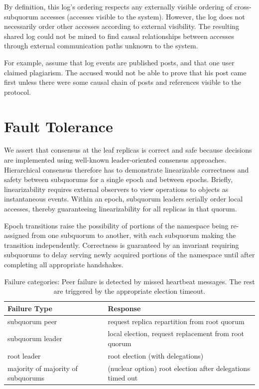 By definition, this log's ordering respects any externally visible ordering of cross-subquorum accesses (accesses visible to the system).
However, the log does not necessarily order other accesses according to external visibility.
The resulting shared log could not be mined to find causal relationships between accesses through external communication paths unknown to the system.

For example, assume that log events are published posts, and that one user claimed plagiarism.
The accused would not be able to prove that his post came first unless there were some causal chain of posts and references visible to the protocol.


\section{Fault Tolerance}
\label{ch03_fault_tolerance}

We assert that consensus at the leaf replicas is correct and safe because decisions are implemented using well-known leader-oriented consensus approaches.
Hierarchical consensus therefore has to demonstrate linearizable correctness and safety between subquorums for a single epoch and between epochs.
Briefly, linearizability requires external observers to view operations to objects as instantaneous events.
Within an epoch, subquorum leaders serially order local accesses, thereby guaranteeing linearizability for all replicas in that quorum.

Epoch transitions raise the possibility of portions of the namespace being re-assigned from one subquorum to another, with each subquorum making the transition independently.
Correctness is guaranteed by an invariant requiring subquorums to delay serving newly acquired portions of the namespace until after completing all appropriate handshakes.


\begin{landscape}
\renewcommand{\baselinestretch}{1}
\small\normalsize
 \begin{table}[ht]
\caption[HC Failure Categories]{Failure categories: Peer failure is detected by missed heartbeat messages. The rest are triggered by the appropriate election timeout.}
\begin{center}
\begin{tabular}{l|l}
\hline
Failure Type & Response \\
\hline \hline
subquorum peer & request replica repartition from root quorum \\
subquorum leader & local election, request replacement from root quorum \\
root leader & root election (with delegations)\\
majority of majority of subquorums & (nuclear option) root election after delegations timed out \\
\hline
\end{tabular}
\end{center}
\label{tab:failure_categories}
\end{table}
 \renewcommand{\baselinestretch}{2}
\small\normalsize
\end{landscape}

